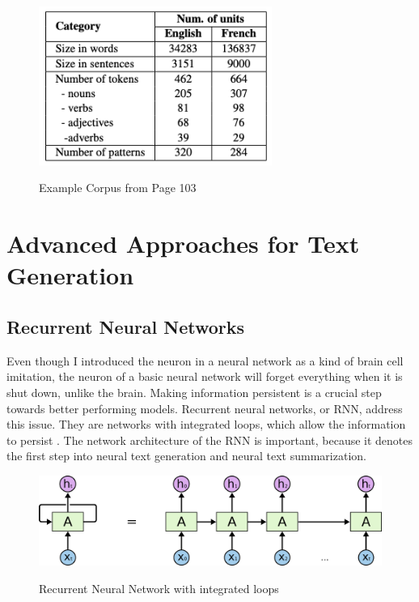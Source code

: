 \begin{figure}
	\begin{center}
		\includegraphics[width=3in]{photos/corpus}\\
		\caption{Example Corpus from \cite{elena} Page 103}\label{corpus}
	\end{center}
\end{figure}

\section{Advanced Approaches for Text Generation}
\subsection{Recurrent Neural Networks}\label{ss:rnn}
Even though I introduced the neuron in a neural network as a kind of brain cell imitation, the neuron of a basic neural network will forget everything when it is shut down, unlike the brain. Making information persistent is a crucial step towards better performing models. Recurrent neural networks, or RNN, address this issue. They are networks with integrated loops, which allow the information to persist \cite{olah}. The network architecture of the RNN is important, because it denotes the first step into neural text generation and neural text summarization. 

\begin{figure}
	\begin{center}
		\includegraphics[width=4.5in]{photos/RNN-unrolled}\\
		\caption{Recurrent Neural Network with integrated loops \cite{olah}}\label{rnn}
	\end{center}
\end{figure}

